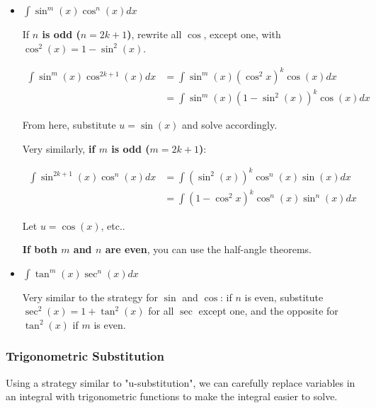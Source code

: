 \documentclass[12pt]{article}
\begin{document}
\begin{itemize}
    \item $\int \sin^m(x)\cos^n(x) dx$
    
    If \textbf{$n$ is odd ($n=2k+1$)}, rewrite all $\cos$, except one, with $\cos^2(x)=1-\sin^2(x)$.
        
        \begin{equation}
            \begin{split}
                \int \sin^{m}(x) \cos^{2k+1}(x) dx &= \int \sin^m(x)(\cos^2x)^k\cos(x) dx\\
                &= \int \sin^m(x)(1-\sin^2(x))^k\cos(x) dx
            \end{split}
        \end{equation}
        
        From here, substitute $u=\sin(x)$ and solve accordingly.
        
        Very similarly, \textbf{if $m$ is odd ($m=2k+1$)}:
        
        \begin{equation}
            \begin{split}
                \int \sin^{2k+1}(x) \cos^{n}(x) dx &= \int (\sin^2(x))^k \cos^n(x) \sin(x) dx\\
                &= \int (1-\cos^2x)^k\cos^n(x)\sin^n(x) dx
            \end{split}
        \end{equation}
        
        Let $u = \cos(x)$, etc..

        \textbf{If both $m$ and $n$ are even}, you can use the half-angle theorems.
        
    \item $\int \tan^m(x)\sec^n(x) dx$
    
    Very similar to the strategy for $\sin$ and $\cos$: if $n$ is even, substitute $\sec^2(x) = 1+\tan^2(x)$ for all $\sec$ except one, and the opposite for $\tan^2(x)$ if $m$ is even.
\end{itemize}

\subsubsection{Trigonometric Substitution}

Using a strategy similar to "u-substitution", we can carefully replace variables in an integral with trigonometric functions to make the integral easier to solve.
\end{document}
